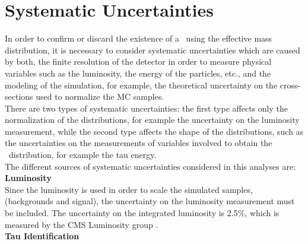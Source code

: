\section{Systematic Uncertainties}
\label{sec:Systematics}

In order to confirm or discard the existence of 
a \Zprime~using the effective mass distribution, it is necessary 
to consider systematic uncertainties which are caused by both, the 
finite resolution of the detector in order to measure physical 
variables such as the luminosity, the energy of the 
particles, etc., and the modeling of the simulation, for example,
the theoretical uncertainty on the cross-sections used to normalize
the MC samples. \\

\noindent There are two types of systematic uncertainties: the first 
type affects only the normalization of the distributions, for example 
the uncertainty on the luminosity measurement, while the 
second type affects the shape of the distributions, such as the 
uncertainties on the measurements of variables involved to 
obtain the \mass~distribution, for example the tau energy. \\

\noindent The different sources of systematic uncertainties considered
in this analyses are:\\

\textbf{Luminosity}\\

\noindent Since the luminosity is used in order to scale the simulated samples, 
(backgrounds and signal), the uncertainty on the luminosity 
measurement must be included. The uncertainty on the integrated
luminosity is 2.5$\%$, which is measured by the CMS Luminosity
group \cite{Luminosity}.\\

\textbf{Tau Identification}\\

